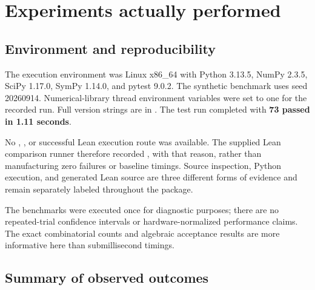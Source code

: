 \section{Experiments actually performed}

\subsection{Environment and reproducibility}

The execution environment was Linux x86\_64 with Python 3.13.5, NumPy 2.3.5,
SciPy 1.17.0, SymPy 1.14.0, and pytest 9.0.2. The synthetic benchmark uses seed
20260914. Numerical-library thread environment variables were set to one for
the recorded run. Full version strings are in .
The test run completed with \textbf{73 passed in 1.11 seconds}.

No , , or successful Lean execution route was available.
The supplied Lean comparison runner therefore recorded , with
that reason, rather than manufacturing zero failures or baseline timings.
Source inspection, Python execution, and generated Lean source are three
different forms of evidence and remain separately labeled throughout the
package.

The benchmarks were executed once for diagnostic purposes; there are no
repeated-trial confidence intervals or hardware-normalized performance claims.
The exact combinatorial counts and algebraic acceptance results are more
informative here than submillisecond timings.

\subsection{Summary of observed outcomes}

